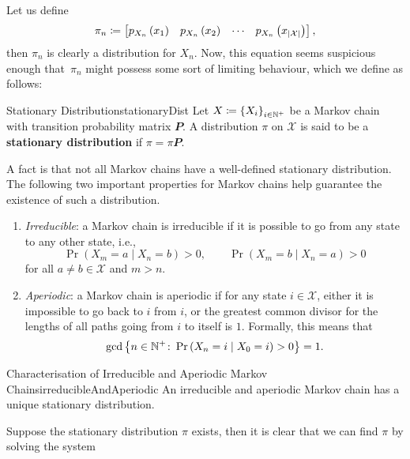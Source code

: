 \documentclass[math, code]{amznotes}
\theoremstyle{remark}
\begin{document}
Let us define 
\begin{equation*}
    \pi_n \coloneqq \begin{bmatrix}
        p_{X_{n}}\left(x_1\right) & p_{X_{n}}\left(x_2\right) & \cdots & p_{X_{n}}\left(x_{{\left\lvert {\mathcal{X}} \right\rvert}}\right)
    \end{bmatrix},
\end{equation*}
then $\pi_n$ is clearly a distribution for $X_n$. Now, this equation seems suspicious enough that~$\pi_n$ might possess some sort of limiting behaviour, which we define as follows:
\begin{dfnbox}{Stationary Distribution}{stationaryDist}
    Let $X \coloneqq \left\{X_i\right\}_{i \in \mathbb{N}^+}$ be a Markov chain with transition probability matrix $\mathbfit{P}$. A distribution $\pi$ on $\mathcal{X}$ is said to be a {\color{red} \textbf{stationary distribution}} if $\pi = \pi\mathbfit{P}$.
\end{dfnbox}
A fact is that not all Markov chains have a well-defined stationary distribution. The following two important properties for Markov chains help guarantee the existence of such a distribution.
\begin{enumerate}
    \item \textit{Irreducible}: a Markov chain is irreducible if it is possible to go from any state to any other state, i.e.,
    \begin{equation*}
        \Pr\left(X_m = a \mid X_n = b\right) > 0, \qquad \Pr\left(X_m = b \mid X_n = a\right) > 0
    \end{equation*}
    for all $a \neq b \in \mathcal{X}$ and $m > n$.
    \item \textit{Aperiodic}: a Markov chain is aperiodic if for any state $i \in \mathcal{X}$, either it is impossible to go back to $i$ from $i$, or the greatest common divisor for the lengths of all paths going from $i$ to itself is $1$. Formally, this means that 
    \begin{equation*}
        \gcd\left\{n \in \mathbb{N}^+ \colon \Pr\left(X_n = i \mid X_0 = i\right) > 0\right\} = 1.
    \end{equation*}
\end{enumerate}
\begin{thmbox}{Characterisation of Irreducible and Aperiodic Markov Chains}{irreducibleAndAperiodic}
    An irreducible and aperiodic Markov chain has a unique stationary distribution.
\end{thmbox}
Suppose the stationary distribution $\pi$ exists, then it is clear that we can find $\pi$ by solving the system 
\end{document}
